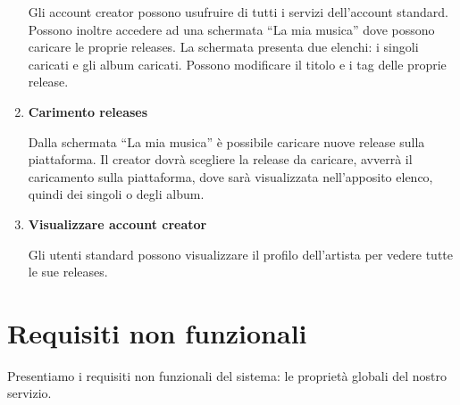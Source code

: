 \documentclass[a4paper,12pt]{article}
\begin{document}
\begin{enumerate}[label=\textbf{RF\arabic*}\;, ref=\textbf{RF\arabic*}]
    Gli account creator possono usufruire di tutti i servizi dell’account standard. Possono inoltre accedere ad una schermata “La mia musica” dove possono caricare le proprie releases. La schermata presenta due elenchi: i singoli caricati e gli album caricati. Possono modificare il titolo e i tag delle proprie release.
    \item \label{caricamento release} \textbf{Carimento releases}
    
    Dalla schermata “La mia musica” è possibile caricare nuove release sulla piattaforma. Il creator dovrà scegliere la release da caricare, avverrà il caricamento sulla piattaforma, dove sarà visualizzata nell’apposito elenco, quindi dei singoli o degli album.
    \item \label{visualizzare account creator} \textbf{Visualizzare account creator}
    
    Gli utenti standard possono visualizzare il profilo dell’artista per vedere tutte le sue releases.
\end{enumerate}

\newpage
\section{Requisiti non funzionali}

Presentiamo i requisiti non funzionali del sistema: le proprietà globali del nostro servizio.
\end{document}
